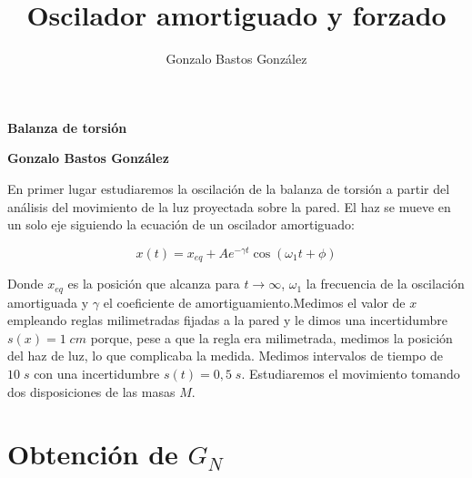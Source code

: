 \documentclass[a4paper,12pt,titlepage]{article}
\title{Oscilador amortiguado y forzado}
\author{Gonzalo Bastos González}
\begin{document}
\begin{center}
    \textbf{\Large Balanza de torsión}
\end{center}

\begin{center}
    \textbf{Gonzalo Bastos González}
\end{center}

En primer lugar estudiaremos la oscilación de la balanza de torsión a partir del análisis del movimiento de la luz proyectada sobre la pared. El haz se mueve en un solo eje siguiendo la ecuación de un oscilador amortiguado:

\begin{equation}
    x(t) = x_{eq} + Ae^{-\gamma t}\cos(\omega_1 t + \phi)
\end{equation}

Donde $x_{eq}$ es la posición que alcanza para $t\to \infty$, $\omega_1$ la frecuencia de la oscilación amortiguada y $\gamma$ el coeficiente de amortiguamiento.Medimos el valor de $x$ empleando reglas milimetradas fijadas a la pared y le dimos una incertidumbre $s(x)=1 \;cm$ porque, pese a que la regla era milimetrada, medimos la posición del haz de luz, lo que complicaba la medida. Medimos intervalos de tiempo de $10\;s$ con una incertidumbre $s(t)=0,5\;s$. Estudiaremos el movimiento tomando dos disposiciones de las masas $M$.

\section{Obtención de $G_N$}
\end{document}
